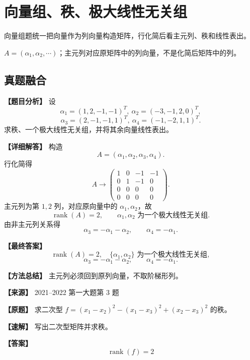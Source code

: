 \documentclass[11pt,a4paper,UTF8]{ctexart}
\newcommand{\rank}{\operatorname{rank}}
\begin{document}
\section{向量组、秩、极大线性无关组}

\begin{identifybox}[识别]
向量组题统一把向量作为列向量构造矩阵，行化简后看主元列、秩和线性表出。
\end{identifybox}
\begin{templatebox}[考场模板]
$A=(\alpha_1,\alpha_2,\cdots)$；主元列对应原矩阵中的列向量，不是化简后矩阵中的列。
\end{templatebox}

\subsection{真题融合}

\begin{answerbox}
\textbf{【题目分析】} 设
\[
\alpha_1=(1,2,-1,-1)^T,\ \alpha_2=(-3,-1,2,0)^T,
\]
\[
\alpha_3=(2,-1,-1,1)^T,\ \alpha_4=(-1,-2,1,1)^T.
\]
求秩、一个极大线性无关组，并将其余向量线性表出。

\textbf{【详细解答】} 构造
\[
A=(\alpha_1,\alpha_2,\alpha_3,\alpha_4).
\]
行化简得
\[
A\to
\begin{pmatrix}
1&0&-1&-1\\
0&1&-1&0\\
0&0&0&0\\
0&0&0&0
\end{pmatrix}.
\]
主元列为第 $1,2$ 列，对应原向量中的 $\alpha_1,\alpha_2$，故
\[
\rank(A)=2,\qquad \alpha_1,\alpha_2\text{ 为一个极大线性无关组}.
\]
由非主元列关系得
\[
\alpha_3=-\alpha_1-\alpha_2,\qquad \alpha_4=-\alpha_1.
\]

\textbf{【最终答案】}
\[
\rank(A)=2,\quad \{\alpha_1,\alpha_2\}\text{ 为一个极大线性无关组},
\]
\[
\alpha_3=-\alpha_1-\alpha_2,\qquad \alpha_4=-\alpha_1.
\]

\textbf{【方法总结】} 主元列必须回到原列向量，不取阶梯形列。
\end{answerbox}

\begin{answerbox}
\textbf{【来源】} 2021--2022 第一大题第 3 题

\textbf{【原题】}
求二次型 $f=(x_1-x_2)^2-(x_1-x_3)^2+(x_2-x_3)^2$ 的秩。

\textbf{【速解】}
写出二次型矩阵并求秩。

\textbf{【答案】}
\[\rank(f)=2\]
\end{answerbox}
\end{document}

